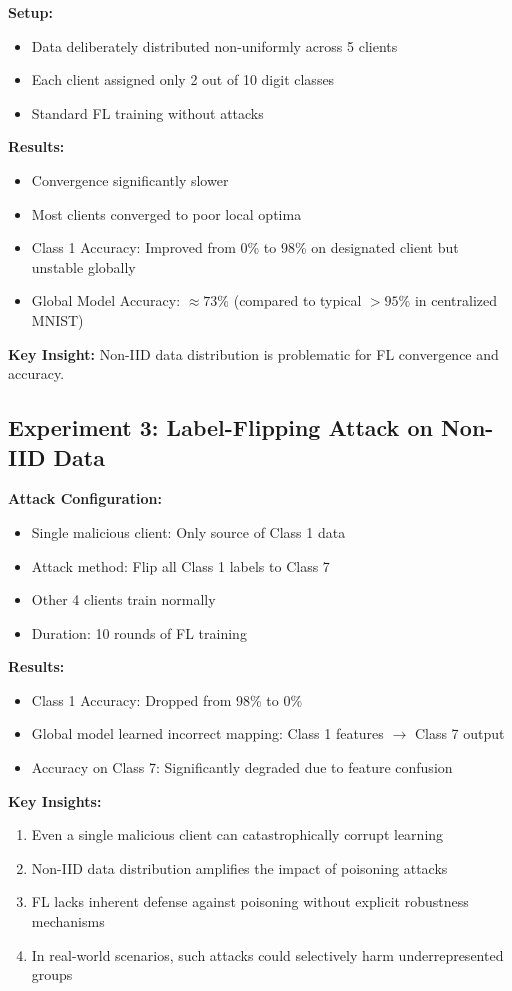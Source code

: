 \documentclass[11pt,a4paper]{report}
\begin{document}
\textbf{Setup:}
\begin{itemize}
    \item Data deliberately distributed non-uniformly across 5 clients
    \item Each client assigned only 2 out of 10 digit classes
    \item Standard FL training without attacks
\end{itemize}

\textbf{Results:}
\begin{itemize}
    \item Convergence significantly slower
    \item Most clients converged to poor local optima
    \item Class 1 Accuracy: Improved from 0\% to 98\% on designated client but unstable globally
    \item Global Model Accuracy: $\approx 73\%$ (compared to typical $> 95\%$ in centralized MNIST)
\end{itemize}

\textbf{Key Insight:} Non-IID data distribution is problematic for FL convergence and accuracy.

\subsection{Experiment 3: Label-Flipping Attack on Non-IID Data}

\textbf{Attack Configuration:}
\begin{itemize}
    \item Single malicious client: Only source of Class 1 data
    \item Attack method: Flip all Class 1 labels to Class 7
    \item Other 4 clients train normally
    \item Duration: 10 rounds of FL training
\end{itemize}

\textbf{Results:}
\begin{itemize}
    \item Class 1 Accuracy: Dropped from 98\% to 0\%
    \item Global model learned incorrect mapping: Class 1 features $\rightarrow$ Class 7 output
    \item Accuracy on Class 7: Significantly degraded due to feature confusion
\end{itemize}

\textbf{Key Insights:}
\begin{enumerate}
    \item Even a single malicious client can catastrophically corrupt learning
    \item Non-IID data distribution amplifies the impact of poisoning attacks
    \item FL lacks inherent defense against poisoning without explicit robustness mechanisms
    \item In real-world scenarios, such attacks could selectively harm underrepresented groups
\end{enumerate}
\end{document}
